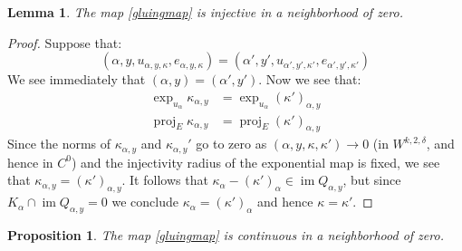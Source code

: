 \documentclass[12pt]{article}
\newtheorem{lemma}[theorem]{Lemma}
\newtheorem{proposition}[theorem]{Proposition}
\theoremstyle{definition}
\theoremstyle{remark}
\numberwithin{equation}{subsection}
\newcommand{\proj}{\operatorname{proj}}
\newcommand{\im}{\operatorname{im}}
\begin{document}
\begin{lemma}\label{gluingisinjective}
The map \eqref{gluingmap} is injective in a neighborhood of zero.
\end{lemma}

\begin{proof}
Suppose that:
\begin{equation}
(\alpha,y,u_{\alpha,y,\kappa},e_{\alpha,y,\kappa})=(\alpha',y',u_{\alpha',y',\kappa'},e_{\alpha',y',\kappa'})
\end{equation}
We see immediately that $(\alpha,y)=(\alpha',y')$.  Now we see that:
\begin{align}
\exp_{u_\alpha}\kappa_{\alpha,y}&=\exp_{u_\alpha}(\kappa')_{\alpha,y}\\
\proj_E\kappa_{\alpha,y}&=\proj_E(\kappa')_{\alpha,y}
\end{align}
Since the norms of $\kappa_{\alpha,y}$ and $\kappa_{\alpha,y}'$ go to zero as $(\alpha,y,\kappa,\kappa')\to 0$ (in $W^{k,2,\delta}$, and hence in $C^0$) and the injectivity radius of the exponential map is fixed, we see that $\kappa_{\alpha,y}=(\kappa')_{\alpha,y}$.  It follows that $\kappa_\alpha-(\kappa')_\alpha\in\im Q_{\alpha,y}$, but since $K_\alpha\cap\im Q_{\alpha,y}=0$ we conclude $\kappa_\alpha=(\kappa')_\alpha$ and hence $\kappa=\kappa'$.
\end{proof}

\begin{proposition}\label{continuityofgluing}
The map \eqref{gluingmap} is continuous in a neighborhood of zero.
\end{proposition}
\end{document}

